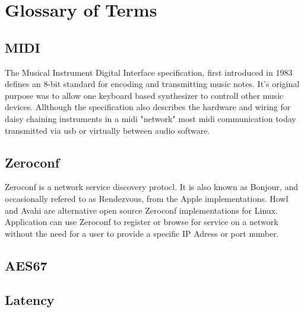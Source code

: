 \section{Glossary of Terms}

\subsection*{MIDI}
The Musical Instrument Digital Interface specification, first introduced in 1983 defines an 8-bit standard for encoding and transmitting music notes. It's original purpose was to allow one keyboard based synthesizer to controll other music devices.\cite{Boulanger:2011} Allthough the specification also describes the hardware and wiring for daisy chaining instruments in a midi "network" most midi communication today transmitted via usb or virtually between audio software.

\subsection*{Zeroconf}
Zeroconf is a network service discovery protocl. It is also known as Bonjour, and occasionally refered to as Rendezvous, from the Apple implementations. Howl and Avahi are alternative open source Zeroconf implementations for Linux. Application can use Zeroconf to register or browse for service on a network without the need for a user to provide a specific IP Adress or port number. \cite{zeroconf}

\subsection*{AES67}

\subsection*{Latency}